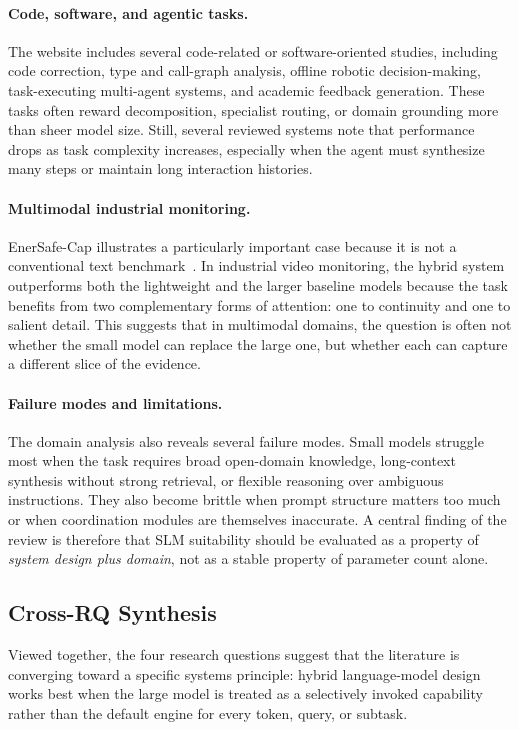 \paragraph{Code, software, and agentic tasks.}
The website includes several code-related or software-oriented studies, including code correction, type and call-graph analysis, offline robotic decision-making, task-executing multi-agent systems, and academic feedback generation. These tasks often reward decomposition, specialist routing, or domain grounding more than sheer model size. Still, several reviewed systems note that performance drops as task complexity increases, especially when the agent must synthesize many steps or maintain long interaction histories.

\paragraph{Multimodal industrial monitoring.}
EnerSafe-Cap illustrates a particularly important case because it is not a conventional text benchmark~\cite{cao2025enersafe}. In industrial video monitoring, the hybrid system outperforms both the lightweight and the larger baseline models because the task benefits from two complementary forms of attention: one to continuity and one to salient detail. This suggests that in multimodal domains, the question is often not whether the small model can replace the large one, but whether each can capture a different slice of the evidence.

\paragraph{Failure modes and limitations.}
The domain analysis also reveals several failure modes. Small models struggle most when the task requires broad open-domain knowledge, long-context synthesis without strong retrieval, or flexible reasoning over ambiguous instructions. They also become brittle when prompt structure matters too much or when coordination modules are themselves inaccurate. A central finding of the review is therefore that SLM suitability should be evaluated as a property of \emph{system design plus domain}, not as a stable property of parameter count alone.

\subsection{Cross-RQ Synthesis}
Viewed together, the four research questions suggest that the literature is converging toward a specific systems principle: hybrid language-model design works best when the large model is treated as a selectively invoked capability rather than the default engine for every token, query, or subtask.


